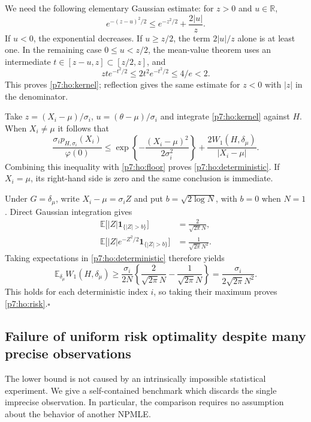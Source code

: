 \documentclass[11pt,a4paper]{article}
\theoremstyle{definition}
\theoremstyle{remark}
\numberwithin{equation}{section}
\begin{document}
We need the following elementary Gaussian estimate: for $z>0$ and
$u\in\mathbb R$,
\begin{equation}\label{p7:ho:kernel}
 e^{-(z-u)^2/2}\le e^{-z^2/2}+\frac{2|u|}{z}.
\end{equation}
If $u<0$, the exponential decreases.  If $u\ge z/2$, the term
$2|u|/z$ alone is at least one.  In the remaining case
$0\le u<z/2$, the mean-value theorem uses an intermediate
$t\in[z-u,z]\subset[z/2,z]$, and
\[
 zt e^{-t^2/2}\le 2t^2e^{-t^2/2}\le4/e<2.
\]
This proves \eqref{p7:ho:kernel}; reflection gives the same estimate for
$z<0$ with $|z|$ in the denominator.

Take $z=(X_i-\mu)/\sigma_i$, $u=(\theta-\mu)/\sigma_i$ and integrate
\eqref{p7:ho:kernel} against $H$.  When $X_i\ne\mu$ it follows that
\[
 \frac{\sigma_i p_{H,\sigma_i}(X_i)}{\varphi(0)}
 \le \exp\left\{-\frac{(X_i-\mu)^2}{2\sigma_i^2}\right\}
       +\frac{2W_1(H,\delta_\mu)}{|X_i-\mu|}.
\]
Combining this inequality with \eqref{p7:ho:floor} proves
\eqref{p7:ho:deterministic}.  If $X_i=\mu$, its right-hand side is zero
and the same conclusion is immediate.

Under $G=\delta_\mu$, write $X_i-\mu=\sigma_i Z$ and put
$b=\sqrt{2\log N}$, with $b=0$ when $N=1$.  Direct Gaussian integration
gives
\begin{align*}
 \mathbb E\bigl[|Z|\mathbf1_{\{|Z|>b\}}\bigr]
     &=\frac{2}{\sqrt{2\pi}N},\\
 \mathbb E\bigl[|Z|e^{-Z^2/2}\mathbf1_{\{|Z|>b\}}\bigr]
     &=\frac{1}{\sqrt{2\pi}N^2}.
\end{align*}
Taking expectations in \eqref{p7:ho:deterministic} therefore yields
\[
 \mathbb E_{\delta_\mu}W_1(H,\delta_\mu)
 \ge\frac{\sigma_i}{2N}
       \left\{\frac{2}{\sqrt{2\pi}N}
                    -\frac{1}{\sqrt{2\pi}N}\right\}
 =\frac{\sigma_i}{2\sqrt{2\pi}N^2}.
\]
This holds for each deterministic index $i$, so taking their maximum
proves \eqref{p7:ho:risk}.\hfill$\square$

\subsection{Failure of uniform risk optimality despite many precise observations}

The lower bound is not caused by an intrinsically impossible statistical
experiment.  We give a self-contained benchmark which discards the
single imprecise observation.  In particular, the comparison requires
no assumption about the behavior of another NPMLE.
\end{document}
